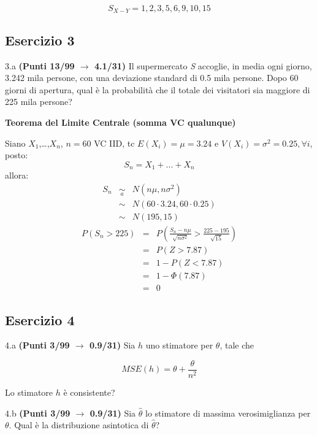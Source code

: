 \documentclass[
  11pt,
]{book}
\theoremstyle{mytheoremstyle}
\theoremstyle{mydefstyle}
\newenvironment{sol}
  {
  \begin{tcolorbox}[enhanced,breakable,arc=0.1mm,boxrule=1pt,colback=white,colframe=iblue,
  title=\bf \fontfamily{lmss}\selectfont \hspace{.5 cm} Soluzione,drop fuzzy shadow]

}{
\end{tcolorbox}
  }
\begin{document}
\begin{sol}
\[S_{X-Y}=1, 2, 3, 5, 6, 9, 10, 15\]

\end{sol}

\subsection{Esercizio 3}\label{esercizio-3-17}

3.a \textbf{(Punti 13/99 \(\rightarrow\) 4.1/31)} Il supermercato \emph{S} accoglie, in media ogni giorno, 3.242 mila persone, con una
deviazione standard di 0.5 mila persone. Dopo 60 giorni di apertura, qual è la probabilità che il
totale dei visitatori sia maggiore di 225 mila persone?

\textbf{Teorema del Limite Centrale (somma VC qualunque)}

Siano \(X_1\),\ldots,\(X_n\), \(n=60\) VC IID, tc \(E(X_i)=\mu=3.24\) e \(V(X_i)=\sigma^2=0.25,\forall i\), posto:
\[
      S_n = X_1 + ... + X_n
      \]
allora:\begin{eqnarray*}
  S_n & \mathop{\sim}\limits_{a}& N(n\mu,n\sigma^2) \\
     &\sim & N(60\cdot3.24,60\cdot0.25) \\
     &\sim & N(195,15) 
  \end{eqnarray*}\begin{eqnarray*}
      P( S_n   >   225 ) 
        &=& P\left(  \frac { S_n  -  n\mu }{ \sqrt{n\sigma^2} }  >  \frac { 225  -  195 }{\sqrt{ 15 }} \right)  \\
                 &=& P\left(  Z   >   7.87 \right) \\    &=& 1-P(Z< 7.87 )\\ 
                 &=&  1-\Phi( 7.87 ) \\ &=&  0 
      \end{eqnarray*}

\subsection{Esercizio 4}\label{esercizio-4-17}

4.a \textbf{(Punti 3/99 \(\rightarrow\) 0.9/31)} Sia \(h\) uno stimatore per \(\theta\), tale che

\[
MSE(h) =  \theta+\frac{\theta}{n^2}
\]

Lo stimatore \(h\) è consistente?

4.b \textbf{(Punti 3/99 \(\rightarrow\) 0.9/31)} Sia \(\hat\theta\) lo stimatore di massima verosimiglianza
per \(\theta\). Qual è la distribuzione asintotica di \(\hat\theta\)?
\end{document}
